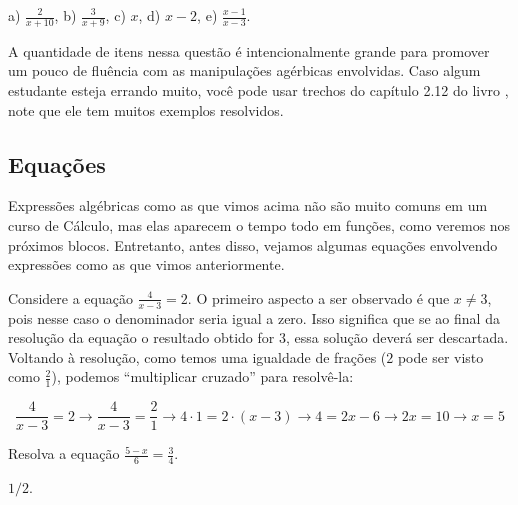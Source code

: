 \documentclass[main_estudante.tex]{subfiles}
\begin{document}
\begin{gabarito}
	\begin{gabaritoQuestao}
		a) $\frac{2}{x+10}$, b) $\frac{3}{x+9}$, c) $x$, d) $x-2$, e) $\frac{x-1}{x-3}$.
	\end{gabaritoQuestao}
\end{gabarito}

\paraTutores

A quantidade de itens nessa questão é intencionalmente grande para promover um pouco de fluência com as manipulações agérbicas envolvidas. Caso algum estudante esteja errando muito, você pode usar trechos do capítulo 2.12 do livro , note que ele tem muitos exemplos resolvidos.

\paraAmbos

\subsection*{Equações}

Expressões algébricas como as que vimos acima não são muito comuns em um curso de Cálculo, mas elas aparecem o tempo todo em funções, como veremos nos próximos blocos. Entretanto, antes disso, vejamos algumas equações envolvendo expressões como as que vimos anteriormente.

Considere a equação $\frac{4}{x-3}=2$. O primeiro aspecto a ser observado é que $x\neq3$, pois nesse caso o denominador seria igual a zero. Isso significa que se ao final da resolução da equação o resultado obtido for $3$, essa solução deverá ser descartada. Voltando à resolução, como temos uma igualdade de frações ($2$ pode ser visto como $\frac{2}{1}$), podemos ``multiplicar cruzado'' para resolvê-la:

$$ \frac{4}{x-3}=2 \longrightarrow \frac{4}{x-3}=\frac{2}{1} \longrightarrow 4 \cdot 1 = 2 \cdot (x-3) \longrightarrow 4=2x-6 \longrightarrow 2x=10 \longrightarrow x=5 $$

\begin{questao}
Resolva a equação $\frac{5-x}{6}=\frac{3}{4}$.
\end{questao}

\begin{gabarito}
	\begin{gabaritoQuestao}
		$1/2$.
	\end{gabaritoQuestao}
\end{gabarito}
\end{document}
